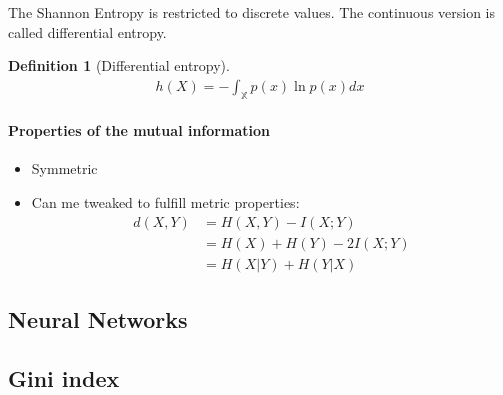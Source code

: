 \documentclass[10pt,a4paper]{article}
\newtheorem{definition}{Definition}
\begin{document}
The Shannon Entropy is restricted to discrete values. The continuous version is called differential entropy.
\begin{definition}[Differential entropy]
\begin{align}
h(X) = - \int_{\mathbb X} p(x) \ln p(x) dx
\end{align}
\end{definition}

\paragraph*{Properties of the mutual information} 
\begin{itemize}
\item Symmetric
\item Can me tweaked to fulfill metric properties:
\begin{align*}
d(X, Y) &= H(X,Y) - I (X;Y) \\ &= H(X) + H(Y) - 2 I(X;Y) \\ &= H (X|Y) + H (Y|X)
\end{align*}
\end{itemize}

\subsection*{Neural Networks}
\subsection*{Gini index}


\end{document}
